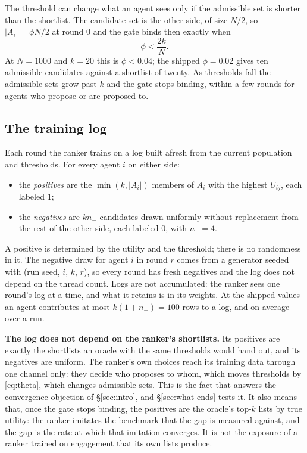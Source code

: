 The threshold can change what an agent sees only if the admissible set is
shorter than the shortlist. The candidate set is the other side, of size $N/2$,
so $|A_i| = \phi N/2$ at round 0 and the gate binds then exactly when
\begin{equation}
\phi < \frac{2k}{N}.
\label{eq:gate}
\end{equation}
At $N = 1000$ and $k = 20$ this is $\phi < 0.04$; the shipped $\phi = 0.02$ gives
ten admissible candidates against a shortlist of twenty. As thresholds fall the
admissible sets grow past $k$ and the gate stops binding, within a few rounds
for agents who propose or are proposed to.

\subsection{The training log}
\label{sec:log}

Each round the ranker trains on a log built afresh from the current population
and thresholds. For every agent $i$ on either side:
\begin{itemize}
\item the \emph{positives} are the $\min(k, |A_i|)$ members of $A_i$ with the
  highest $U_{ij}$, each labeled 1;
\item the \emph{negatives} are $k n_{-}$ candidates drawn uniformly without
  replacement from the rest of the other side, each labeled 0, with $n_{-} = 4$.
\end{itemize}
A positive is determined by the utility and the threshold; there is no
randomness in it. The negative draw for agent $i$ in round $r$ comes from a
generator seeded with (run seed, $i$, $k$, $r$), so every round has fresh
negatives and the log does not depend on the thread count. Logs are not
accumulated: the ranker sees one round's log at a time, and what it retains is in
its weights. At the shipped values an agent contributes at most $k(1 + n_{-}) =
100$ rows to a log, and \rowsPerRound{} on average over a run.

\textbf{The log does not depend on the ranker's shortlists.} Its positives are
exactly the shortlists an oracle with the same thresholds would hand out, and its
negatives are uniform. The ranker's own choices reach its training data through
one channel only: they decide who proposes to whom, which moves thresholds by
\eqref{eq:theta}, which changes admissible sets. This is the fact that answers
the convergence objection of \S\ref{sec:intro}, and \S\ref{sec:what-ends} tests
it. It also means that, once the gate stops binding, the positives are the
oracle's top-$k$ lists by true utility: the ranker imitates the benchmark that the
gap is measured against, and the gap is the rate at which that imitation
converges. It is not the exposure of a ranker trained on engagement that its own
lists produce.

